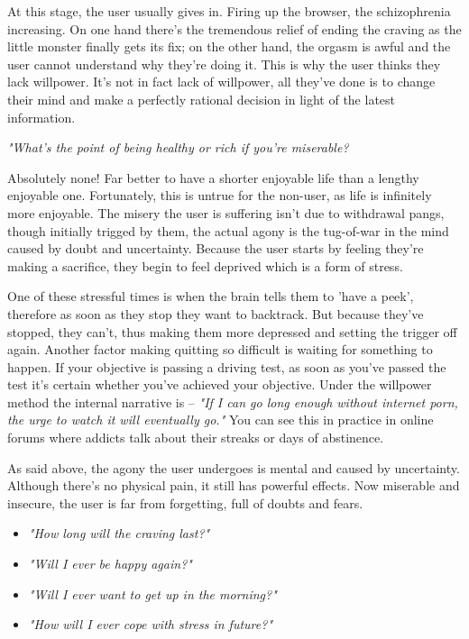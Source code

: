 \documentclass[easypeasy.tex]{subfiles}
\begin{document}
At this stage, the user usually gives in. Firing up the browser, the schizophrenia increasing. On one hand there's the tremendous relief of ending the craving as the little monster finally gets its fix; on the other hand, the orgasm is awful and the user cannot understand why they're doing it. This is why the user thinks they lack willpower. It's not in fact lack of willpower, all they've done is to change their mind and make a perfectly rational decision in light of the latest information.
  
  \textit{"What's the point of being healthy or rich if you're miserable?}

Absolutely none! Far better to have a shorter enjoyable life than a lengthy enjoyable one. Fortunately, this is untrue for the non-user, as life is infinitely more enjoyable. The misery the user is suffering isn't due to withdrawal pangs, though initially trigged by them, the actual agony is the tug-of-war in the mind caused by doubt and uncertainty. Because the user starts by feeling they're making a sacrifice, they begin to feel deprived which is a form of stress.

One of these stressful times is when the brain tells them to 'have a peek', therefore as soon as they stop they want to backtrack. But because they've stopped, they can't, thus making them more depressed and setting the trigger off again. Another factor making quitting so difficult is waiting for something to happen. If your objective is passing a driving test, as soon as you've passed the test it's certain whether you've achieved your objective. Under the willpower method the internal narrative is -- \textit{"If I can go long enough without internet porn, the urge to watch it will eventually go."} You can see this in practice in online forums where addicts talk about their streaks or days of abstinence.

As said above, the agony the user undergoes is mental and caused by uncertainty. Although there's no physical pain, it still has powerful effects. Now miserable and insecure, the user is far from forgetting, full of doubts and fears.

\begin{itemize}
  \item \textit{"How long will the craving last?"}
  \item \textit{"Will I ever be happy again?"}
  \item \textit{"Will I ever want to get up in the morning?"}
  \item \textit{"How will I ever cope with stress in future?"}
\end{itemize}
\end{document}
